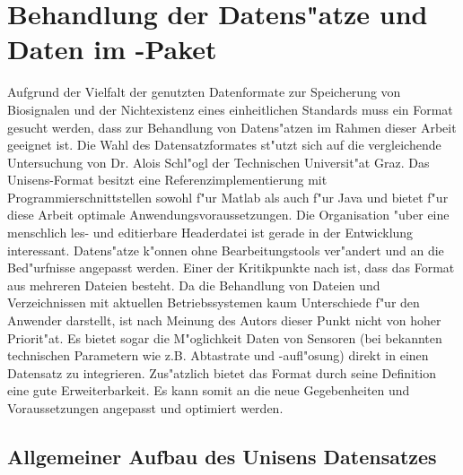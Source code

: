 \section{Behandlung der Datens"atze und Daten im -Paket}
\label{sec:data}

Aufgrund der Vielfalt der genutzten Datenformate zur Speicherung von Biosignalen und der Nichtexistenz eines einheitlichen Standards \cite{Schlogl2009, Varri2001, Wang2010} muss ein Format gesucht werden, dass zur Behandlung von Datens"atzen im Rahmen dieser Arbeit geeignet ist.
Die Wahl des Datensatzformates st"utzt sich auf die vergleichende Untersuchung \cite{Schlogl2009} von Dr. Alois Schl"ogl der Technischen Universit"at Graz.
Das Unisens-Format besitzt eine Referenzimplementierung mit Programmierschnittstellen sowohl f"ur Matlab als auch f"ur Java und bietet f"ur diese Arbeit optimale Anwendungsvoraussetzungen.
Die Organisation "uber eine menschlich les- und editierbare Headerdatei ist gerade in der Entwicklung interessant.
Datens"atze k"onnen ohne Bearbeitungstools ver"andert und an die Bed"urfnisse angepasst werden.
Einer der Kritikpunkte nach \cite{Schlogl2009} ist, dass das Format aus mehreren Dateien besteht.
Da die Behandlung von Dateien und Verzeichnissen mit aktuellen Betriebssystemen kaum Unterschiede f"ur den Anwender darstellt, ist nach Meinung des Autors dieser Punkt nicht von hoher Priorit"at.
Es bietet sogar die M"oglichkeit Daten von Sensoren (bei bekannten technischen Parametern wie z.B. Abtastrate und -aufl"osung) direkt in einen Datensatz zu integrieren.
Zus"atzlich bietet das Format durch seine Definition eine gute Erweiterbarkeit.
Es kann somit an die neue Gegebenheiten und Voraussetzungen angepasst und optimiert werden.


\subsection{Allgemeiner Aufbau des Unisens Datensatzes}

